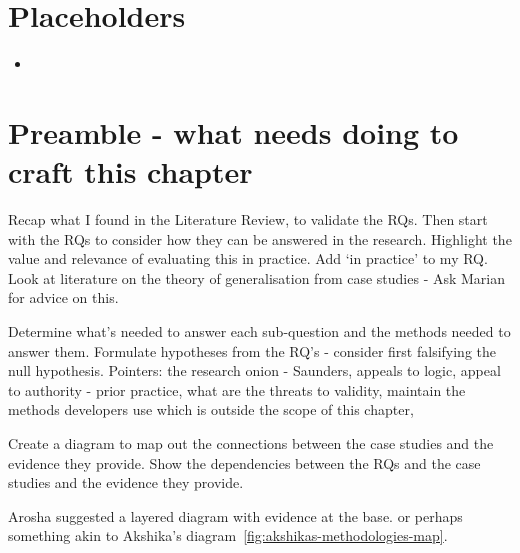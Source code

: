 
\section{Placeholders}
\begin{itemize}
    \item \citep{soiferman2010_compare_and_contrast_inductive_and_deductive_research_approaches}
\end{itemize}

\section*{Preamble - what needs doing to craft this chapter}
{\small
Recap what I found in the Literature Review, to validate the RQs. Then start with the RQs to consider how they can be answered in the research. Highlight the value and relevance of evaluating this in practice. Add `in practice' to my RQ. Look at literature on the theory of generalisation from case studies - Ask Marian for advice on this.

Determine what's needed to answer each sub-question and the methods needed to answer them. Formulate hypotheses from the RQ's - consider first falsifying the null hypothesis. Pointers: the research onion - Saunders, appeals to logic, appeal to authority - prior practice, what are the threats to validity, maintain the methods developers use which is outside the scope of this chapter,

Create a diagram to map out the connections between the case studies and the evidence they provide. Show the dependencies between the RQs and the case studies and the evidence they provide.

Arosha suggested a layered diagram with evidence at the base. or perhaps something akin to Akshika's diagram~\ref{fig:akshikas-methodologies-map}.
}

